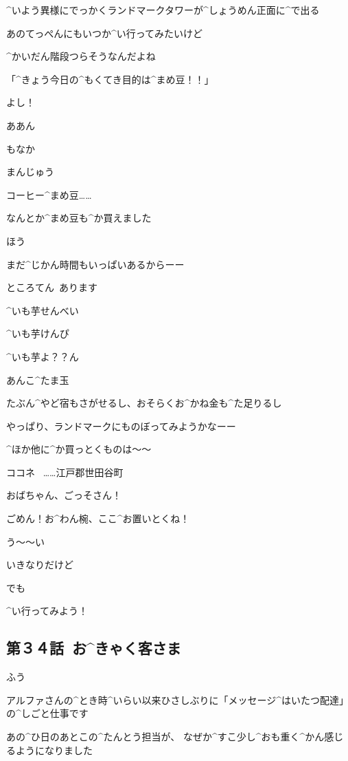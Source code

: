 \Alpha ^{いよう}{異様}にでっかくランドマークタワーが^{しょうめん}{正面}に^{で}{出}る

\page[16]
\Alpha あのてっぺんにもいつか^{い}{行}ってみたいけど

\Alpha ^{かいだん}{階段}つらそうなんだよね

\page[17]
\Alpha 「^{きょう}{今日}の^{もくてき}{目的}は^{まめ}{豆}！！」

\Alpha よし！

\page[18]
\Alpha ああん

\Sign もなか

\Sign まんじゅう

\Alpha コーヒー^{まめ}{豆}……

\Alpha なんとか^{まめ}{豆}も^{か}{買}えました

\Alpha ほう

\page[19]
\Alpha まだ^{じかん}{時間}もいっぱいあるからーー

\Sign ところてん\ あります

\Sign ^{いも}{芋}せんべい

\Sign ^{いも}{芋}けんぴ

\Sign ^{いも}{芋}よ？？ん

\Sign あんこ^{たま}{玉}

\Alpha たぶん^{やど}{宿}もさがせるし、おそらくお^{かね}{金}も^{た}{足}りるし

\page[20]
\Alpha やっぱり、ランドマークにものぼってみようかなーー

\Alpha ^{ほか}{他}に^{か}{買}っとくものは〜〜

\page[21]
\Sign ココネ
\ ……江戸郡世田谷町

\page[23]
\Alpha おばちゃん、ごっそさん！

\Alpha ごめん！お^{わん}{椀}、ここ^{お}{置}いとくね！

\Person う〜〜い

\page[24]
\Alpha いきなりだけど

\Alpha でも

\Alpha ^{い}{行}ってみよう！


\subsection{第３４話\ お^{きゃく}{客}さま}

\page[26]
\Kokone ふう

\Kokone アルファさんの^{とき}{時}^{いらい}{以来}ひさしぶりに「メッセージ^{はいたつ}{配達}」の^{しごと}{仕事}です

\page[27]
\Kokone あの^{ひ}{日}のあとこの^{たんとう}{担当}が、
なぜか^{すこ}{少}し^{おも}{重}く^{かん}{感}じるようになりました

